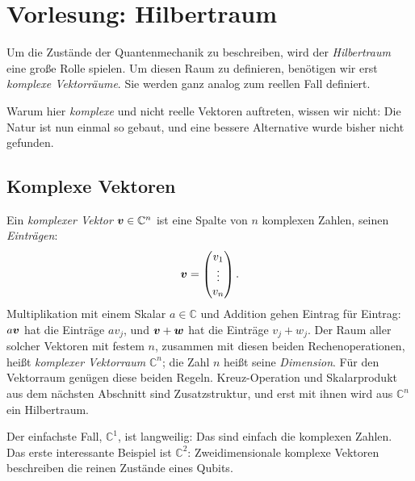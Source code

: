 
\section{Vorlesung: Hilbertraum}
Um die Zustände der Quantenmechanik zu beschreiben, wird der \emph{Hilbertraum} eine große Rolle spielen. Um diesen Raum zu definieren, benötigen wir erst \emph{komplexe Vektorräume}. Sie werden ganz analog zum reellen Fall definiert.

Warum hier \emph{komplexe} und nicht reelle Vektoren auftreten, wissen wir nicht: Die Natur ist nun einmal so gebaut, und eine bessere Alternative wurde bisher nicht gefunden.

\subsection{Komplexe Vektoren}
Ein \emph{komplexer Vektor} $\boldsymbol{v}\in\mathbb{C}^n$ ist eine Spalte von $n$ komplexen Zahlen, seinen \emph{Einträgen}:
\begin{equation}
	\boldsymbol{v} = \begin{pmatrix} v_1 \\ \vdots \\ v_n \end{pmatrix}.
\end{equation}
Multiplikation mit einem Skalar $a\in\mathbb{C}$ und Addition gehen Eintrag für Eintrag: $a\boldsymbol{v}$ hat die Einträge $a v_j$, und $\boldsymbol{v}+\boldsymbol{w}$ hat die Einträge $v_j+w_j$. Der Raum aller solcher Vektoren mit festem $n$, zusammen mit diesen beiden Rechenoperationen, heißt \emph{komplexer Vektorraum} $\mathbb{C}^n$; die Zahl $n$ heißt seine \emph{Dimension}. Für den Vektorraum genügen diese beiden Regeln. Kreuz-Operation und Skalarprodukt aus dem nächsten Abschnitt sind Zusatzstruktur, und erst mit ihnen wird aus $\mathbb{C}^n$ ein Hilbertraum.

Der einfachste Fall, $\mathbb{C}^1$, ist langweilig: Das sind einfach die komplexen Zahlen. Das erste interessante Beispiel ist $\mathbb{C}^2$: Zweidimensionale komplexe Vektoren beschreiben die reinen Zustände eines Qubits.

